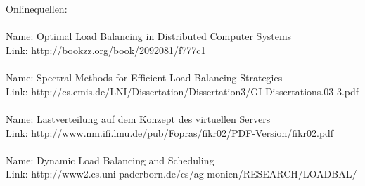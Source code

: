 \documentclass[12p]{article}
\begin{document}
	\\
	\\
	Onlinequellen:\\
	\\
	Name:    Optimal Load Balancing in Distributed Computer Systems\\
	Link:    http://bookzz.org/book/2092081/f777c1\\
	\\
	Name:    Spectral Methods for Efficient Load Balancing Strategies\\
	Link:    http://cs.emis.de/LNI/Dissertation/Dissertation3/GI-Dissertations.03-3.pdf\\
	\\
	Name:    Lastverteilung auf dem Konzept des virtuellen Servers\\
	Link:    http://www.nm.ifi.lmu.de/pub/Fopras/fikr02/PDF-Version/fikr02.pdf\\
	\\
	Name: Dynamic Load Balancing and Scheduling\\
	Link: http://www2.cs.uni-paderborn.de/cs/ag-monien/RESEARCH/LOADBAL/\\
	\\
	
\end{document}
